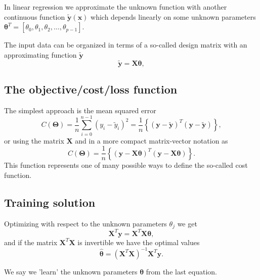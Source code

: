 \documentclass[%
oneside,                 %
final,                   %
10pt]{article}
\begin{document}
In linear regression we approximate the unknown function with another
continuous function $\tilde{\bm{y}}(\bm{x})$ which depends linearly on
some unknown parameters
$\bm{\theta}^T=[\theta_0,\theta_1,\theta_2,\dots,\theta_{p-1}]$.

The input data can be organized in terms of a so-called design matrix 
with an approximating function $\bm{\tilde{y}}$ 
\[
\bm{\tilde{y}}= \bm{X}\bm{\theta},
\]

\subsection{The objective/cost/loss function}

The  simplest approach is the mean squared error
\[
C(\bm{\Theta})=\frac{1}{n}\sum_{i=0}^{n-1}\left(y_i-\tilde{y}_i\right)^2=\frac{1}{n}\left\{\left(\bm{y}-\bm{\tilde{y}}\right)^T\left(\bm{y}-\bm{\tilde{y}}\right)\right\},
\]
or using the matrix $\bm{X}$ and in a more compact matrix-vector notation as
\[
C(\bm{\Theta})=\frac{1}{n}\left\{\left(\bm{y}-\bm{X}\bm{\theta}\right)^T\left(\bm{y}-\bm{X}\bm{\theta}\right)\right\}.
\]
This function represents one of many possible ways to define the so-called cost function.

\subsection{Training solution}

Optimizing with respect to the unknown parameters $\theta_j$ we get 
\[
\bm{X}^T\bm{y} = \bm{X}^T\bm{X}\bm{\theta},  
\]
and if the matrix $\bm{X}^T\bm{X}$ is invertible we have the optimal values
\[
\hat{\bm{\theta}} =\left(\bm{X}^T\bm{X}\right)^{-1}\bm{X}^T\bm{y}.
\]

We say we 'learn' the unknown parameters $\bm{\theta}$ from the last equation.

\end{document}

